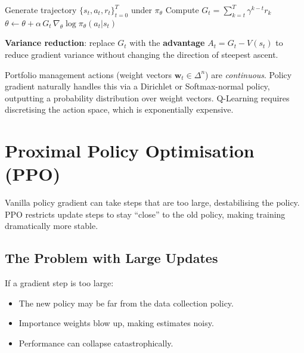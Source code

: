 \documentclass[12pt,a4paper]{article}
\begin{document}
\begin{algorithm}[H]
\caption{REINFORCE}
\begin{algorithmic}[1]
  \State Generate trajectory $\{s_t, a_t, r_t\}_{t=0}^T$ under $\pi_\theta$
    \State Compute $G_t = \sum_{k=t}^T \gamma^{k-t} r_k$
    \State $\theta \leftarrow \theta + \alpha\, G_t\, \nabla_\theta \log\pi_\theta(a_t|s_t)$
  \EndFor
\EndFor
\end{algorithmic}
\end{algorithm}

\textbf{Variance reduction}: replace $G_t$ with the \textbf{advantage}
$A_t = G_t - V(s_t)$ to reduce gradient variance without changing the
direction of steepest ascent.

\begin{finbox}
Portfolio management actions (weight vectors $\mathbf{w}_t \in \Delta^n$)
are \emph{continuous}.  Policy gradient naturally handles this via a
Dirichlet or Softmax-normal policy, outputting a probability distribution
over weight vectors.  Q-Learning requires discretising the action space,
which is exponentially expensive.
\end{finbox}

\section{Proximal Policy Optimisation (PPO)}

\begin{insbox}
Vanilla policy gradient can take steps that are too large, destabilising
the policy.  PPO restricts update steps to stay ``close'' to the old
policy, making training dramatically more stable.
\end{insbox}

\subsection{The Problem with Large Updates}

If a gradient step is too large:
\begin{itemize}[nosep]
  \item The new policy may be far from the data collection policy.
  \item Importance weights blow up, making estimates noisy.
  \item Performance can collapse catastrophically.
\end{itemize}
\end{document}
